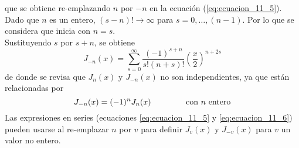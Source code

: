 que se obtiene re-emplazando $n$ por $-n$ en la ecuación (\ref{eq:ecuacion_11_5}). Dado que $n$ es un entero, $(s-n)! \to \infty$ para $s=0, \ldots,(n-1)$. Por lo que se considera que inicia con $n=s$.
\\
Sustituyendo $s$ por $s+n$, se obtiene
\begin{equation}
J_{-n}(x) = \sum_{s=0}^{\infty} \dfrac{(-1)^{s+n}}{s!(n+s)!} \left( \dfrac{x}{2} \right)^{n+2s}
\label{eq:ecuacion_11_7}
\end{equation}
de donde se revisa que $J_{n}(x)$ y $J_{-n}(x)$ no son independientes, ya que están relacionadas por
\begin{equation}
J_{-n}(x) = (-1)^{n} J_{n}(x) \hspace{1.5cm} \text{con $n$ entero}
\label{eq:ecuacion_11_8}
\end{equation}
Las expresiones en series (ecuaciones \ref{eq:ecuacion_11_5} y \ref{eq:ecuacion_11_6}) pueden usarse al re-emplazar $n$ por $v$ para definir $J_{v}(x)$ y $J_{-v}(x)$ para $v$ un valor no entero.
